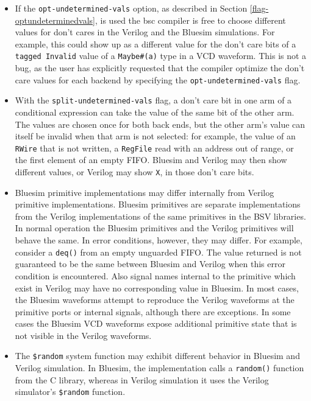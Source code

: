 \documentclass{article}
\newcommand{\te}[1]{\texttt{#1}}
\begin{document}
\begin{itemize}

\item  If the \te{opt-undetermined-vals} option, as described
in Section \ref{flag-optundeterminedvals}, is used the bsc
compiler is free to choose  different values for don't cares in  the
Verilog  and the Bluesim simulations.  For example,  this  could show up as
a different value for the don't care bits of a \te{tagged Invalid}
value of a \te{Maybe\#(a)} type in a VCD waveform.  This
is not a bug, as the user has explicitly requested that the compiler
optimize the don't care values for each backend by specifying the
\te{opt-undetermined-vals} flag.

\item With the \te{split-undetermined-vals} flag, a don't care bit in one
arm of a conditional expression can take the value of the same bit of the
other arm.  The values are chosen once for both back ends, but the other
arm's value can itself be invalid when that arm is not selected: for
example, the value of an \te{RWire} that is not written, a \te{RegFile}
read with an address out of range, or the first element of an empty FIFO.
Bluesim and Verilog may then show different values, or Verilog may show
\te{X}, in those don't care bits.



\item Bluesim primitive implementations may differ internally from
Verilog primitive implementations.  Bluesim primitives are separate
implementations from the Verilog implementations of the same
primitives in the BSV libraries.  In normal operation the Bluesim
primitives and the Verilog primitives will behave the same.  In error
conditions, however, they may differ.  For example, consider a \te{deq()} from an
empty unguarded FIFO.  The value returned is not guaranteed to be the
same between Bluesim and Verilog when this error condition is
encountered.  Also signal names internal to the primitive which exist in
Verilog may have no corresponding value in Bluesim. In most cases, the
Bluesim waveforms attempt to reproduce the Verilog waveforms at the
primitive ports or internal signals, although there are exceptions.
In some cases the Bluesim VCD waveforms expose additional primitive
state that is not visible in the Verilog waveforms. 

\item  The \te{\$random} system function may exhibit different
behavior in Bluesim and Verilog 
simulation.  In Bluesim, the implementation calls a \te{random()} function from
the C library, whereas in Verilog simulation it uses the Verilog simulator's
\te{\$random} function.  %




\end{itemize}
\end{document}
